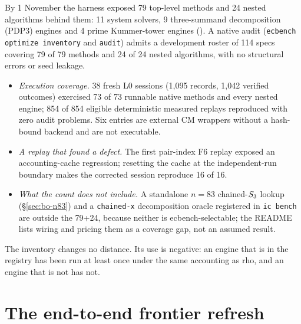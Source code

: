 By 1 November the harness exposed 79 top-level methods and 24 nested
algorithms behind them: 11 system solvers, 9 three-summand decomposition
(PDP3) engines and 4 prime Kummer-tower engines
(). A native
audit (\texttt{ecbench optimize inventory} and \texttt{audit}) admits a
development roster of 114 specs covering 79 of 79 methods and 24 of 24
nested algorithms, with no structural errors or seed leakage.
\begin{itemize}
\item \emph{Execution coverage.} 38 fresh L0 sessions (1{,}095 records,
  1{,}042 verified outcomes) exercised 73 of 73 runnable native methods and
  every nested engine; 854 of 854 eligible deterministic measured replays
  reproduced with zero audit problems. Six entries are external CM wrappers
  without a hash-bound backend and are not executable.
\item \emph{A replay that found a defect.} The first pair-index F6 replay
  exposed an accounting-cache regression; resetting the cache at the
  independent-run boundary makes the corrected session reproduce 16 of 16.
\item \emph{What the count does not include.} A standalone $n=83$
  chained-$S_{3}$ lookup (\S\ref{sec:bo-n83}) and a \texttt{chained-x}
  decomposition oracle registered in \texttt{ic bench} are outside the
  79+24, because neither is ecbench-selectable; the README lists wiring and
  pricing them as a coverage gap, not an assumed result.
\end{itemize}
The inventory changes no distance. Its use is negative: an engine that is
in the registry has been run at least once under the same accounting as
rho, and an engine that is not has not.

\section{The end-to-end frontier refresh}\label{sec:em-frontier}

